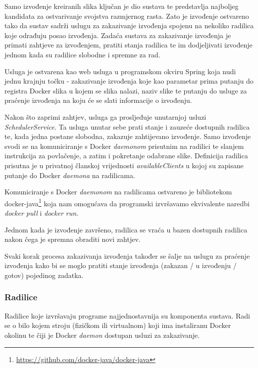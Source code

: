 \documentclass[times, utf8, zavrsni]{fer}
\begin{document}
{Samo izvođenje kreiranih slika ključan je dio sustava te predstavlja najboljeg kandidata za ostvarivanje svojstva razmjernog rasta. Zato je izvođenje ostvareno tako da sustav sadrži uslugu za zakazivanje izvođenja spojenu na nekoliko radilica koje odrađuju posao izvođenja. Zadaća sustava za zakazivanje izvođenja je primati zahtjeve za izvođenjem, pratiti stanja radilica te im dodjeljivati izvođenje jednom kada su radilice slobodne i spremne za rad.

Usluga je ostvarena kao web usluga u programskom okviru Spring koja nudi jednu krajnju točku - zakazivanje izvođenja koje kao parametar prima putanju do registra Docker slika u kojem se slika nalazi, naziv slike te putanju do usluge za praćenje izvođenja na koju će se slati informacije o izvođenju.

Nakon što zaprimi zahtjev, usluga ga prosljeđuje unutarnjoj usluzi {\textit{SchedulerService}}. Ta usluga unutar sebe prati stanje i zauzeće dostupnih radilica te, kada jedna postane slobodna, zakazuje zahtijevano izvođenje. Samo izvođenje svodi se na komuniciranje s Docker {\textit{daemonom}} prisutnim na radilici te slanjem instrukcija za povlačenje, a zatim i pokretanje odabrane slike. Definicija radilica prisutna je u privatnoj članskoj vrijednosti {\textit{availableClients}} u kojoj su zapisane putanje do Docker {\textit{daemona}} na radilicama.

Komuniciranje s Docker {\textit{daemonom}} na radilicama ostvareno je bibliotekom docker-java{\footnote{\url{https://github.com/docker-java/docker-java}}} koja nam omogućava da programski izvršavamo ekvivalente naredbi {\textit{docker pull}} i {\textit{docker run}}.

Jednom kada je izvođenje završeno, radilica se vraća u bazen dostupnih radilica nakon čega je spremna obraditi novi zahtjev.

Svaki korak procesa zakazivanja izvođenja također se šalje na uslugu za praćenje izvođenja kako bi se moglo pratiti stanje izvođenja (zakazan / u izvođenju / gotov) pojedinog zadatka.

\subsubsection{Radilice}

Radilice koje izvršavaju programe najjednostavnija su komponenta sustava. Radi se o bilo kojem stroju (fizičkom ili virtualnom) koji ima instaliranu Docker okolinu te čiji je Docker {\textit{daemon}} dostupan usluzi za zakazivanje.

}
\end{document}

